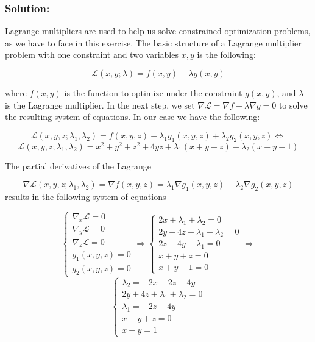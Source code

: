 \documentclass[
]{article}
\begin{document}
\hypertarget{section-5}{%
\subsubsection{\texorpdfstring{\underline{Solution}:}{:}}\label{section-5}}

Lagrange multipliers are used to help us solve constrained optimization
problems, as we have to face in this exercise. The basic structure of a
Lagrange multiplier problem with one constraint and two variables
\(x,y\) is the following:

\[
\mathcal{L}(x,y;\lambda) = f(x,y) + \lambda g(x,y)
\]

where \(f(x,y)\) is the function to optimize under the constraint
\(g(x,y)\), and \(\lambda\) is the Lagrange multiplier. In the next
step, we set \(\nabla\mathcal{L}=\nabla f +\lambda\nabla g=0\) to solve
the resulting system of equations. In our case we have the following:

\[
\mathcal{L}(x,y,z;\lambda_1,\lambda_2) = f(x,y,z) + \lambda_1 g_1(x,y,z) +\lambda_2g_2(x,y,z)\Leftrightarrow
\] \[
\mathcal{L}(x,y,z;\lambda_1,\lambda_2) = x^2+y^2+z^2+4yz +\lambda_1(x+y+z) +\lambda_2(x+y-1)
\]

The partial derivatives of the Lagrange

\[
\nabla\mathcal{L}(x,y,z;\lambda_1,\lambda_2) = \nabla f(x,y,z) = \lambda_1 \nabla g_1(x,y,z) + \lambda_2 \nabla g_2(x,y,z)
\] results in the following system of equations

\[
\begin{cases}
  \nabla_x \mathcal{L}=0 \\
  \nabla_y \mathcal{L}=0 \\
  \nabla_z \mathcal{L}=0 \\
  g_1(x,y,z)=0 \\
  g_2(x,y,z)=0
\end{cases} \Rightarrow \begin{cases}
  2x+\lambda_1+\lambda_2=0 \\
  2y+4z+\lambda_1+\lambda_2=0 \\
  2z+4y+\lambda_1 = 0 \\
  x+y+z=0\\
  x+y-1=0
\end{cases} \Rightarrow 
\] \[
\begin{cases}
\lambda_2=-2x-2z-4y\\
2y+4z+\lambda_1+\lambda_2=0\\
\lambda_1=-2z-4y\\
x+y+z=0\\
x+y=1
\end{cases}
\]
\end{document}

